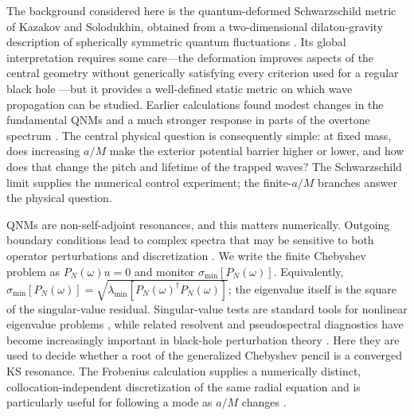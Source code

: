 \documentclass[12pt,a4paper]{article}
\begin{document}
\color{blue}
The background considered here is the quantum-deformed Schwarzschild metric of
Kazakov and Solodukhin, obtained from a two-dimensional dilaton-gravity
description of spherically symmetric quantum fluctuations \cite{Kazakov1994}.
Its global interpretation requires some care---the deformation improves aspects
of the central geometry without generically satisfying every criterion used for
a regular black hole \cite{Berry2021}---but it provides a well-defined static
metric on which wave propagation can be studied. Earlier calculations found
modest changes in the fundamental QNMs and a much stronger response in parts of
the overtone spectrum \cite{Konoplya2020,Bolokhov2025}.  The central physical
question is consequently simple: at fixed mass, does increasing \(a/M\) make
the exterior potential barrier higher or lower, and how does that change the
pitch and lifetime of the trapped waves?  The Schwarzschild limit supplies the
numerical control experiment; the finite-\(a/M\) branches answer the physical
question.
\color{black}

\color{blue}
QNMs are non-self-adjoint resonances, and this matters numerically. Outgoing
boundary conditions lead to complex spectra that may be sensitive to both
operator perturbations and discretization \cite{Jaramillo2021,Cao2024}. We
write the finite Chebyshev problem as \(P_N(\omega)u=0\) and monitor
\(\sigma_{\min}[P_N(\omega)]\). Equivalently,
\(\sigma_{\min}[P_N(\omega)]=
\sqrt{\lambda_{\min}[P_N(\omega)^\dagger P_N(\omega)]}\); the eigenvalue itself
is the square of the singular-value residual. Singular-value tests are standard tools
for nonlinear eigenvalue problems \cite{Sadkane2023}, while related resolvent
and pseudospectral diagnostics have become increasingly important in black-hole
perturbation theory \cite{Jaramillo2021,Cao2024}. Here they are used to decide
whether a root of the generalized Chebyshev pencil is a converged KS resonance.
The Frobenius calculation supplies a numerically distinct, collocation-independent discretization of the
same radial equation and is particularly useful for following a mode as
\(a/M\) changes \cite{Leaver1985,Bolokhov2025}.
\color{black}
\end{document}
